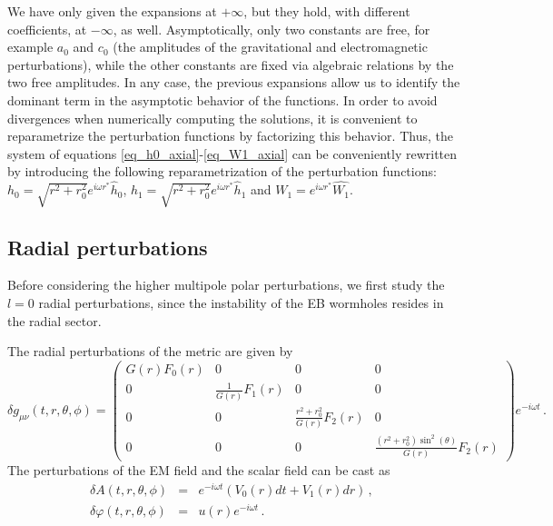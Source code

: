 \documentclass[11pt,a4paper]{article}
\begin{document}
We have only given the expansions at $+\infty$, but they hold,
with different coefficients,
at $-\infty$, as well. 
Asymptotically, only two constants are free, for example $a_0$ and $c_0$ (the amplitudes of the gravitational and electromagnetic perturbations), while the other constants are fixed via algebraic relations by the two free amplitudes.
In any case, the previous expansions allow us to identify the dominant term in the asymptotic behavior of the functions. In order to avoid divergences when numerically computing the solutions, it is convenient to reparametrize the perturbation functions by factorizing this behavior. 
Thus, the system of equations \eqref{eq_h0_axial}-\eqref{eq_W1_axial} can be conveniently rewritten
by introducing the following reparametrization of the perturbation functions:
$h_0 = \sqrt{r^2+r_0^2}e^{i\omega r^*}\hat{h}_0$, 
$h_1 = \sqrt{r^2+r_0^2}e^{i\omega r^*}\hat{h}_1$
and 
$W_1 = e^{i\omega r^*}\hat{W_1}$.


\subsection{Radial perturbations}


Before considering the higher multipole polar perturbations, we first study the $l=0$ radial perturbations, since the instability of the EB wormholes resides in the radial sector. 

The radial perturbations of the metric are given by
%
\begin{equation}
    \delta g_{\mu\nu}(t,r,\theta,\phi)=\begin{pmatrix}
G(r)F_0(r) & 0 & 0 & 0\\
0 & \frac{1}{G(r)}F_1(r) & 0 & 0\\
0 & 0 & \frac{r^2+r_0^2}{G(r)}F_2(r) & 0\\
0 & 0 & 0 & \frac{(r^2+r_0^2)\sin^2(\theta)}{G(r)}F_2(r)
\end{pmatrix}e^{-i\omega t} \,.
\end{equation}
%
The perturbations of the EM field and the scalar field can be cast as
\begin{eqnarray}\label{deltaA_radial}
\delta A(t,r,\theta,\phi)&=& e^{-i\omega t} \left( V_0(r)dt  
+ V_1(r)dr   
\right) \, ,
\ \ \ \\
\delta\varphi(t,r,\theta,\phi)&=&u(r)e^{-i\omega t} \, .
\end{eqnarray}
%
\end{document}
